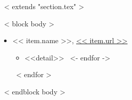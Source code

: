 ~< extends "section.tex" >~

~< block body >~
  \begin{itemize}
    ~< for item in items >~
      \item << item.name >>, \href{https://scholar.google.com/citations?user=<< item.url >>}{<< item.url >>}
        \iftrue
        \begin{itemize}
          ~< for detail in item.details ->~
            \item <<detail>>
          ~<- endfor ->~
        \end{itemize}
        \fi
    ~< endfor >~
  \end{itemize}
~< endblock body >~
